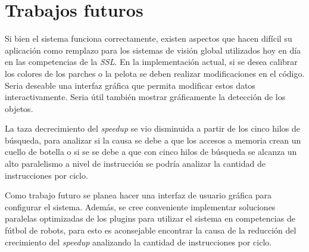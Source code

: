 \section{Trabajos futuros}

\label{trabajosFuturos}

Si bien el sistema funciona correctamente, existen aspectos que hacen difícil su
aplicación como remplazo para los sistemas de visión global utilizados hoy en
día en las competencias de la \emph{SSL}. En la implementación actual, si se
desea calibrar los colores de los parches o la pelota se deben realizar
modificaciones en el código. Seria deseable una interfaz gráfica que permita
modificar estos datos interactivamente. Seria útil también mostrar gráficamente
la detección de los objetos.

La taza decrecimiento del \emph{speedup} se vio disminuida a partir de los cinco
hilos de búsqueda, para analizar si la causa se debe a que los accesos a memoria
crean un cuello de botella o si se se debe a que con cinco hilos de búsqueda se
alcanza un alto paralelismo a nivel de instrucción se podría analizar la
cantidad de instrucciones por ciclo.

Como trabajo futuro se planea hacer una interfaz de usuario gráfica para
configurar el sistema. Además, se cree conveniente implementar soluciones
paralelas optimizadas de los plugins para utilizar el sistema en competencias de
fútbol de robots, para esto es aconsejable encontrar la causa de la reducción
del crecimiento del \emph{speedup} analizando la cantidad de instrucciones por
ciclo.
